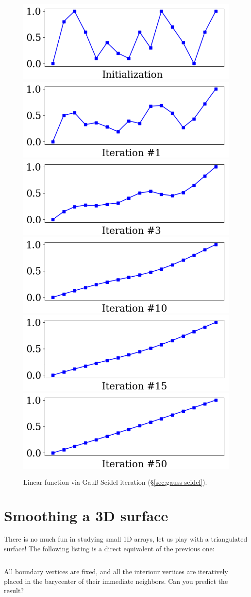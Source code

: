\documentclass[notitlepage,oneside]{book}
\begin{document}
\begin{figure}[ht]
    \centering
    \includegraphics[width=.32\linewidth]{img/example_3.2_0.png}
    \includegraphics[width=.32\linewidth]{img/example_3.2_1.png}
    \includegraphics[width=.32\linewidth]{img/example_3.2_2.png}
    \includegraphics[width=.32\linewidth]{img/example_3.2_3.png}
    \includegraphics[width=.32\linewidth]{img/example_3.2_4.png}
    \includegraphics[width=.32\linewidth]{img/example_3.2_5.png}
    \caption{Linear function via Gauß-Seidel iteration (\S\ref{sec:gauss-seidel}).}
    \label{fig:arraysmooth_gs}
\end{figure}

\section{Smoothing a 3D surface}
\label{sec:3dsmooth}
There is no much fun in studying small 1D arrays, let us play with a triangulated surface! The following listing is a direct equivalent of the previous one:
\inputminted[frame=single,linenos=true]{python}{listings/example_3.3.py}
All boundary vertices are fixed, and all the interiour vertices are iteratively placed in the barycenter of their immediate neighbors.
Can you predict the result?
\end{document}
